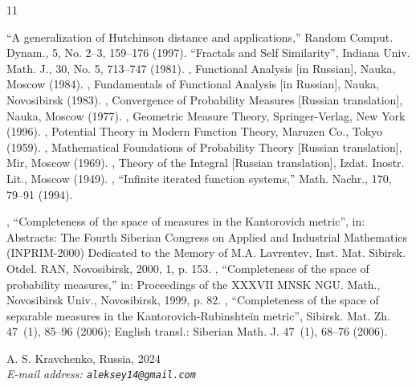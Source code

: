 \documentclass[11pt,a4paper]{article}
\begin{document}
\begin{thebibliography} {11} %

``A generalization of Hutchinson distance and applications,''
Random Comput. Dynam., 5, No. 2--3, 159--176 (1997).
 ``Fractals and Self Similarity'',
 Indiana Univ. Math. J., 30, No. 5, 713--747 (1981).
, Functional Analysis [in Russian],
 Nauka, Moscow (1984).
, Fundamentals of Functional Analysis [in Russian],
 Nauka, Novosibirsk (1983).
, Convergence of Probability Measures
 [Russian translation], Nauka, Moscow (1977).
, Geometric Measure Theory,
 Springer-Verlag, New York (1996).
, Potential Theory in Modern Function Theory,
 Maruzen Co., Tokyo (1959).
, Mathematical Foundations of Probability Theory [Russian translation],
 Mir, Moscow (1969).
, Theory of the Integral [Russian translation],
 Izdat. Inostr. Lit., Moscow (1949).
, ``Infinite iterated function systems,''
 Math. Nachr., 170, 79--91 (1994).

, ``Completeness of the space of measures in the Kantorovich metric'',
in: Abstracts: The Fourth Siberian Congress on Applied and Industrial Mathematics (INPRIM-2000)
Dedicated to the Memory of M.A. Lavrentev,
Inst. Mat. Sibirsk. Otdel. RAN, Novosibirsk, 2000, 1, p. 153.
 , ``Completeness of the space of probability measures,''
in: Proceedings of the XXXVII MNSK NGU. Math., Novosibirsk Univ., Novosibirsk, 1999, p. 82.
, ``Completeness of the space of separable measures
in the Kantorovich-Rubinshte\u{i}n metric'', Sibirsk. Mat. Zh. 47~(1), 85--96 (2006);
English transl.: Siberian Math. J. 47~(1), 68--76 (2006).
\end{thebibliography}

\indent\hspace{6pt}\sc A. S. Kravchenko, Russia, 2024 \\
\indent\hspace{6pt}\it E-mail address: \tt aleksey14@gmail.com
\end{document}
